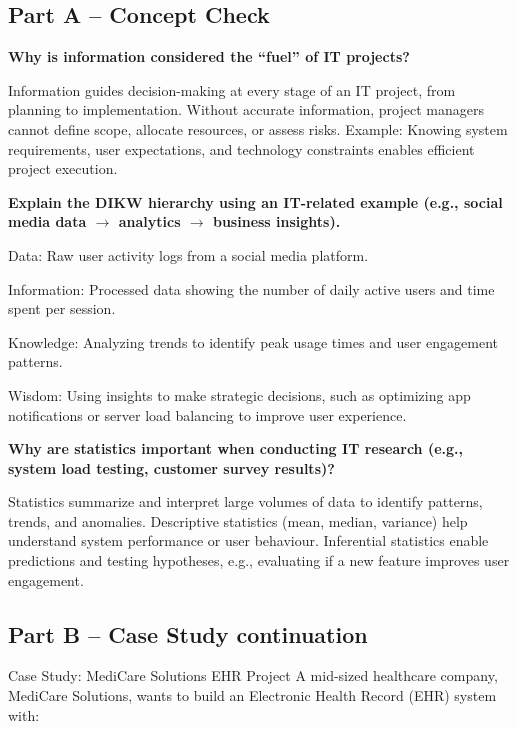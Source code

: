 \subsection{Part A – Concept Check}

\indent 

\noindent\textbf{Why is information considered the “fuel” of IT projects?}

Information guides decision-making at every stage of an IT project, from planning to implementation. Without accurate information, project managers cannot define scope, allocate resources, or assess risks. Example: Knowing system requirements, user expectations, and technology constraints enables efficient project execution.

\bigskip

\noindent\textbf{Explain the DIKW hierarchy using an IT-related example (e.g., social media data $\xrightarrow{}$ analytics $\xrightarrow{}$ business insights).}


Data: Raw user activity logs from a social media platform. 

Information: Processed data showing the number of daily active users and time spent per session.

Knowledge: Analyzing trends to identify peak usage times and user engagement patterns. 

Wisdom: Using insights to make strategic decisions, such as optimizing app notifications or server load balancing to improve user experience.


\bigskip

\noindent\textbf{Why are statistics important when conducting IT research (e.g., system load testing, customer survey results)?}


Statistics summarize and interpret large volumes of data to identify patterns, trends, and anomalies. Descriptive statistics (mean, median, variance) help understand system performance or user behaviour. Inferential statistics enable predictions and testing hypotheses, e.g., evaluating if a new feature improves user engagement.

\subsection{Part B – Case Study continuation}

\indent 

Case Study: MediCare Solutions EHR Project A mid-sized healthcare company, MediCare Solutions, wants to build an Electronic Health Record (EHR) system with:


